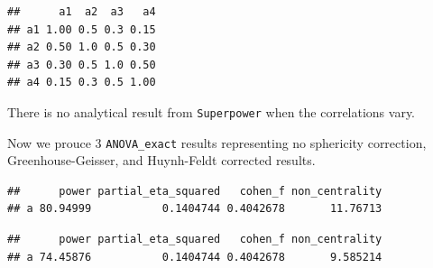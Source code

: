 \documentclass[]{book}
\newenvironment{Shaded}{\begin{snugshade}}{\end{snugshade}}
\newcommand{\DataTypeTok}[1]{\textcolor[rgb]{0.13,0.29,0.53}{#1}}
\newcommand{\KeywordTok}[1]{\textcolor[rgb]{0.13,0.29,0.53}{\textbf{#1}}}
\newcommand{\NormalTok}[1]{#1}
\newcommand{\OperatorTok}[1]{\textcolor[rgb]{0.81,0.36,0.00}{\textbf{#1}}}
\newcommand{\OtherTok}[1]{\textcolor[rgb]{0.56,0.35,0.01}{#1}}
\newcommand{\StringTok}[1]{\textcolor[rgb]{0.31,0.60,0.02}{#1}}
\begin{document}
\begin{verbatim}
##      a1  a2  a3   a4
## a1 1.00 0.5 0.3 0.15
## a2 0.50 1.0 0.5 0.30
## a3 0.30 0.5 1.0 0.50
## a4 0.15 0.3 0.5 1.00
\end{verbatim}

There is no analytical result from \texttt{Superpower} when the correlations vary.

Now we prouce 3 \texttt{ANOVA\_exact} results representing no sphericity correction, Greenhouse-Geisser, and Huynh-Feldt corrected results.

\begin{Shaded}
\end{Shaded}

\begin{verbatim}
##      power partial_eta_squared   cohen_f non_centrality
## a 80.94999           0.1404744 0.4042678       11.76713
\end{verbatim}

\begin{Shaded}
\end{Shaded}

\begin{verbatim}
##      power partial_eta_squared   cohen_f non_centrality
## a 74.45876           0.1404744 0.4042678       9.585214
\end{verbatim}

\begin{Shaded}
\end{Shaded}
\end{document}
